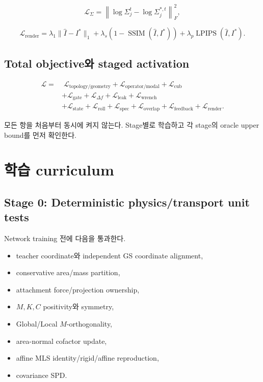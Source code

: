 \documentclass[11pt,a4paper]{article}
\begin{document}
\begin{equation}
  \mathcal L_{\Sigma}
  =
  \left\|
  \log\Sigma_j^t-\log\Sigma_j^{*,t}
  \right\|_F^2,
\end{equation}

\begin{equation}
  \mathcal L_{\mathrm{render}}
  =
  \lambda_1\|\widehat I-I^*\|_1
  +\lambda_s(1-\operatorname{SSIM}(\widehat I,I^*))
  +\lambda_p\operatorname{LPIPS}(\widehat I,I^*).
\end{equation}

\subsection{Total objective와 staged activation}

\begin{equation}
\begin{aligned}
  \mathcal L
  =&\;
  \mathcal L_{\mathrm{topology/geometry}}
  +\mathcal L_{\mathrm{operator/modal}}
  +\mathcal L_{\mathrm{cub}}\\
  &+\mathcal L_{\mathrm{gate}}
  +\mathcal L_{\Delta f}
  +\mathcal L_{\mathrm{leak}}
  +\mathcal L_{\mathrm{wrench}}\\
  &+\mathcal L_{\mathrm{state}}
  +\mathcal L_{\mathrm{roll}}
  +\mathcal L_{\mathrm{spec}}
  +\mathcal L_{\mathrm{overlap}}
  +\mathcal L_{\mathrm{feedback}}
  +\mathcal L_{\mathrm{render}}.
\end{aligned}
\end{equation}

모든 항을 처음부터 동시에 켜지 않는다.
Stage별로 학습하고 각 stage의 oracle upper bound를 먼저 확인한다.

\section{학습 curriculum}

\subsection{Stage 0: Deterministic physics/transport unit tests}

Network training 전에 다음을 통과한다.

\begin{itemize}[leftmargin=1.5em]
  \item teacher coordinate와 independent GS coordinate alignment,
  \item conservative area/mass partition,
  \item attachment force/projection ownership,
  \item \(M,K,C\) positivity와 symmetry,
  \item Global/Local \(M\)-orthogonality,
  \item area-normal cofactor update,
  \item affine MLS identity/rigid/affine reproduction,
  \item covariance SPD.
\end{itemize}
\end{document}
